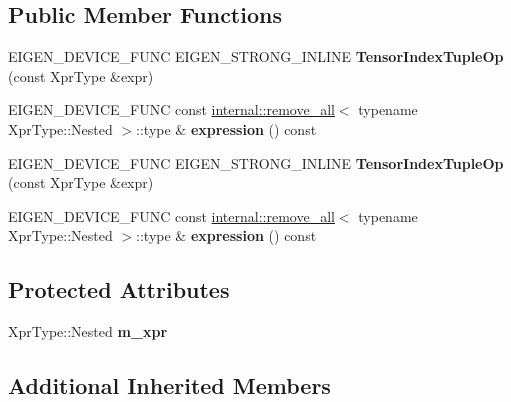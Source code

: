 \subsection*{Public Member Functions}
\begin{DoxyCompactItemize}
\item 
\mbox{\label{class_eigen_1_1_tensor_index_tuple_op_a5ac165199bab93ffd0d9726e5348a80b}} 
E\+I\+G\+E\+N\+\_\+\+D\+E\+V\+I\+C\+E\+\_\+\+F\+U\+NC E\+I\+G\+E\+N\+\_\+\+S\+T\+R\+O\+N\+G\+\_\+\+I\+N\+L\+I\+NE {\bfseries Tensor\+Index\+Tuple\+Op} (const Xpr\+Type \&expr)
\item 
\mbox{\label{class_eigen_1_1_tensor_index_tuple_op_a7ed20677a80990efde7f4b53b63aa928}} 
E\+I\+G\+E\+N\+\_\+\+D\+E\+V\+I\+C\+E\+\_\+\+F\+U\+NC const \hyperlink{struct_eigen_1_1internal_1_1remove__all}{internal\+::remove\+\_\+all}$<$ typename Xpr\+Type\+::\+Nested $>$\+::type \& {\bfseries expression} () const
\item 
\mbox{\label{class_eigen_1_1_tensor_index_tuple_op_a5ac165199bab93ffd0d9726e5348a80b}} 
E\+I\+G\+E\+N\+\_\+\+D\+E\+V\+I\+C\+E\+\_\+\+F\+U\+NC E\+I\+G\+E\+N\+\_\+\+S\+T\+R\+O\+N\+G\+\_\+\+I\+N\+L\+I\+NE {\bfseries Tensor\+Index\+Tuple\+Op} (const Xpr\+Type \&expr)
\item 
\mbox{\label{class_eigen_1_1_tensor_index_tuple_op_a7ed20677a80990efde7f4b53b63aa928}} 
E\+I\+G\+E\+N\+\_\+\+D\+E\+V\+I\+C\+E\+\_\+\+F\+U\+NC const \hyperlink{struct_eigen_1_1internal_1_1remove__all}{internal\+::remove\+\_\+all}$<$ typename Xpr\+Type\+::\+Nested $>$\+::type \& {\bfseries expression} () const
\end{DoxyCompactItemize}
\subsection*{Protected Attributes}
\begin{DoxyCompactItemize}
\item 
\mbox{\label{class_eigen_1_1_tensor_index_tuple_op_af309c5f796be48dce10666cde69b077a}} 
Xpr\+Type\+::\+Nested {\bfseries m\+\_\+xpr}
\end{DoxyCompactItemize}
\subsection*{Additional Inherited Members}


